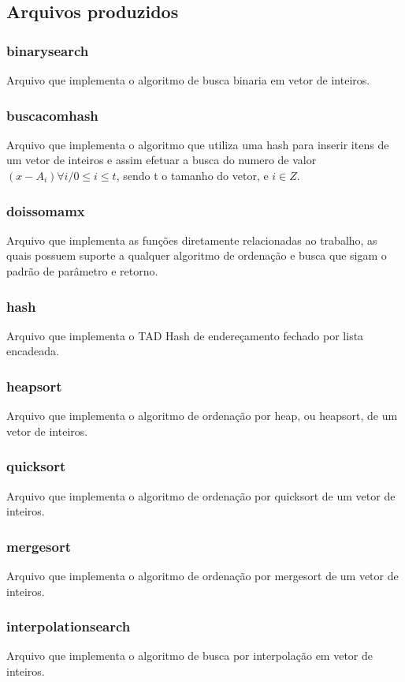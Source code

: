 \documentclass[12pt]{article}
\begin{document}
        \subsection{Arquivos produzidos}\label{arquivos}
            \subsubsection{binarysearch}
                Arquivo que implementa o algoritmo de busca binaria em vetor de inteiros.
            \subsubsection{buscacomhash}
                Arquivo que implementa o algoritmo que utiliza uma hash para inserir itens de um vetor de inteiros e assim efetuar a busca do numero de valor $(x-A_{i}) \forall i / 0 \leq i \leq t$, sendo t o tamanho do vetor, e $i \in Z$.
            \subsubsection{doissomamx}
                Arquivo que implementa as funções diretamente relacionadas ao trabalho, as quais possuem suporte a qualquer algoritmo de ordenação e busca que sigam o padrão de parâmetro e retorno. 
            \subsubsection{hash}
                Arquivo que implementa o TAD Hash de endereçamento fechado por lista encadeada.
            \subsubsection{heapsort}
                Arquivo que implementa o algoritmo de ordenação por heap, ou heapsort, de um vetor de inteiros.
            \subsubsection{quicksort}
                Arquivo que implementa o algoritmo de ordenação por quicksort de um vetor de inteiros.
            \subsubsection{mergesort}
                Arquivo que implementa o algoritmo de ordenação por mergesort de um vetor de inteiros.
            \subsubsection{interpolationsearch}
                Arquivo que implementa o algoritmo de busca por interpolação em vetor de inteiros.
\end{document}
